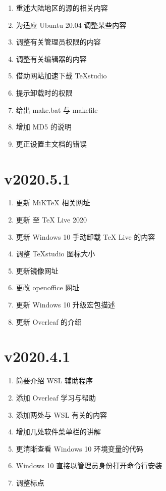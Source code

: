 \begin{enumerate}
  \item 重述大陆地区的源的相关内容
  \item 为适应 Ubuntu 20.04 调整某些内容
  \item 调整有关管理员权限的内容
  \item 调整有关编辑器的内容
  \item 借助网站加速下载 TeXstudio
  \item 提示卸载时的权限
  \item 给出 make.bat 与 makefile
  \item 增加 MD5 的说明
  \item 更正设置主文档的错误
\end{enumerate}

\section*{v2020.5.1}

\begin{enumerate}
  \item 更新 MiK\TeX{} 相关网址
  \item 更新 至 \TeX{} Live 2020
  \item 更新 Windows 10 手动卸载 \TeX{} Live 的内容
  \item 调整 \TeX studio 图标大小
  \item 更新镜像网址
  \item 更改 openoffice 网址
  \item 更新 Windows 10 升级宏包描述
  \item 更新 Overleaf 的介绍
\end{enumerate}

\section*{v2020.4.1}

\begin{enumerate}
  \item 简要介绍 WSL 辅助程序
  \item 添加 Overleaf 学习与帮助
  \item 添加两处与 WSL 有关的内容
  \item 增加几处软件菜单栏的讲解
  \item 更清晰查看 Windows 10 环境变量的代码
  \item Windows 10 直接以管理员身份打开命令行安装
  \item 调整标点
\end{enumerate}

